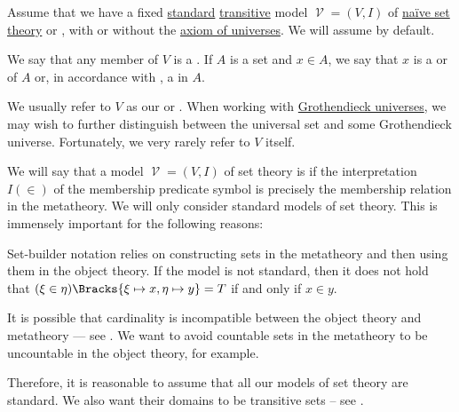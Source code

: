 \begin{definition}\label{def:set}
  Assume that we have a fixed \hyperref[rem:standard_model_of_set_theory]{standard} \hyperref[rem:transitive_model_of_set_theory]{transitive} model \( \mscrV = (V, I) \) of \hyperref[def:naive_set_theory]{na\"ive set theory} or \hyperref[def:zfc]{}, with or without the \hyperref[def:axiom_of_universes]{axiom of universes}. We will assume  by default.

  We say that any member of \( V \) is a . If \( A \) is a set and \( x \in A \), we say that \( x \) is a  or  of \( A \) or, in accordance with , a  in \( A \).

  We usually refer to \( V \) as our  or . When working with \hyperref[def:grothendieck_universe]{Grothendieck universes}, we may wish to further distinguish between the universal set and some Grothendieck universe. Fortunately, we very rarely refer to \( V \) itself.
\end{definition}

\begin{remark}\label{rem:standard_model_of_set_theory}
  We will say that a model \( \mscrV = (V, I) \) of set theory is  if the interpretation \( I(\in) \) of the membership predicate symbol is precisely the membership relation in the metatheory. We will only consider standard models of set theory. This is immensely important for the following reasons:

  \begin{itemize}
     Set-builder notation relies on constructing sets in the metatheory and then using them in the object theory. If the model is not standard, then it does not hold that \( (\xi \in \eta)\Bracks{\xi \mapsto x, \eta \mapsto y} = T \) if and only if \( x \in y \).

     It is possible that cardinality is incompatible between the object theory and metatheory --- see . We want to avoid countable sets in the metatheory to be uncountable in the object theory, for example.
  \end{itemize}

  Therefore, it is reasonable to assume that all our models of set theory are standard. We also want their domains to be transitive sets -- see .
\end{remark}

